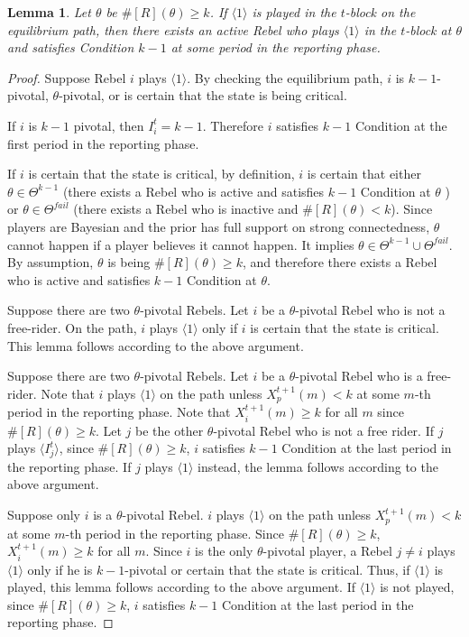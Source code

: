 \documentclass[12pt,letter]{article}
\newtheorem{lemma}{Lemma}[section]
\theoremstyle{definition}
\theoremstyle{definition}
\theoremstyle{remark}
\theoremstyle{claim}
\begin{document}
\begin{lemma} Let $\theta$ be $\#[R](\theta)\geq k$. If $\langle 1 \rangle$ is played in the $t$-block on the equilibrium path, then there exists an active Rebel who plays $\langle 1 \rangle$ in the $t$-block at $\theta$ and satisfies Condition $k-1$ at some period in the reporting phase.
\end{lemma}
\begin{proof}
Suppose Rebel $i$ plays $\langle 1 \rangle$. By checking the equilibrium path, $i$ is $k-1$-pivotal, $\theta$-pivotal, or is certain that the state is being critical.



If $i$ is $k-1$ pivotal, then $I^t_i=k-1$. Therefore $i$ satisfies $k-1$ Condition at the first period in the reporting phase.

If $i$ is certain that the state is critical, by definition, $i$ is certain that either $\theta\in \Theta^{k-1}$ (there exists a Rebel who is active and satisfies $k-1$ Condition at $\theta$ ) or $\theta\in \Theta^{fail}$ (there exists a Rebel who is inactive and $\#[R](\theta)<k$). Since players are Bayesian and the prior has full support on strong connectedness, $\theta$ cannot happen if a player believes it cannot happen. It implies $\theta\in \Theta^{k-1}\cup \Theta^{fail}$. By assumption, $\theta$ is being $\#[R](\theta)\geq k$, and therefore there exists a Rebel who is active and satisfies $k-1$ Condition at $\theta$.

Suppose there are two $\theta$-pivotal Rebels. Let $i$ be a $\theta$-pivotal Rebel who is not a free-rider. On the path, $i$ plays $\langle 1 \rangle$ only if $i$ is certain that the state is critical. This lemma follows according to the above argument.

Suppose there are two $\theta$-pivotal Rebels. Let $i$ be a $\theta$-pivotal Rebel who is a free-rider. Note that $i$ plays $\langle 1 \rangle$ on the path unless $X^{t+1}_p(m)<k$ at some $m$-th period in the reporting phase. Note that $X^{t+1}_i(m)\geq k$ for all $m$ since $\#[R](\theta)\geq k$. Let $j$ be the other $\theta$-pivotal Rebel who is not a free rider. If $j$ plays $\langle I^t_{j} \rangle$, since $\#[R](\theta)\geq k$, $i$ satisfies $k-1$ Condition at the last period in the reporting phase. If $j$ plays $\langle 1 \rangle$ instead, the lemma follows according to the above argument.

Suppose only $i$ is a $\theta$-pivotal Rebel. $i$ plays $\langle 1 \rangle$ on the path unless $X^{t+1}_p(m)<k$ at some $m$-th period in the reporting phase. Since $\#[R](\theta)\geq k$, $X^{t+1}_i(m)\geq k$ for all $m$. Since $i$ is the only $\theta$-pivotal player, a Rebel $j\neq i$ plays $\langle 1 \rangle$ only if he is $k-1$-pivotal or certain that the state is critical. Thus, if $\langle 1 \rangle$ is played, this lemma follows according to the above argument. If $\langle 1 \rangle$ is not played, since $\#[R](\theta)\geq k$, $i$ satisfies $k-1$ Condition at the last period in the reporting phase. 



\end{proof}
\end{document}
